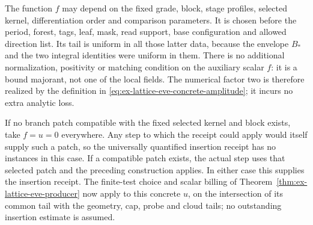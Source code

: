 The function $f$ may depend on the fixed grade, block, stage profiles,
selected kernel, differentiation order and comparison parameters. It is
chosen before the period, forest, tags, leaf, mask, read support, base
configuration and allowed direction list. Its tail is uniform in all
those latter data, because the envelope $B_*$ and the two integral
identities were uniform in them. There is no additional normalization,
positivity or matching condition on the auxiliary scalar $f$: it is a
bound majorant, not one of the local fields. The numerical factor two
is therefore realized by the definition in
\eqref{eq:ex-lattice-eve-concrete-amplitude}; it incurs no extra
analytic loss.

If no branch patch compatible with the fixed selected kernel and block
exists, take $f=u=0$ everywhere. Any step to which the receipt could
apply would itself supply such a patch, so the universally quantified
insertion receipt has no instances in this case. If a compatible patch
exists, the actual step uses that selected patch and the preceding
construction applies. In either case this supplies the insertion
receipt. The finite-test choice and scalar billing of
Theorem~\ref{thm:ex-lattice-eve-producer} now apply to this concrete
$u$, on the intersection of its common tail with the geometry, cap,
probe and cloud tails; no outstanding insertion estimate is assumed.

